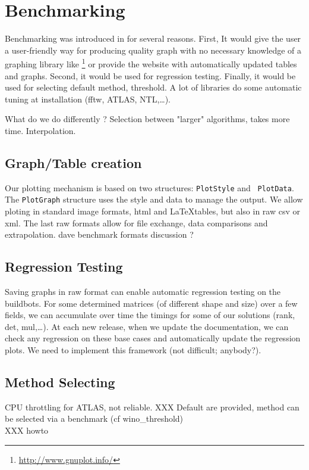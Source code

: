 \section{Benchmarking}\label{sec:bench}
%
Benchmarking was introduced in \linbox for several reasons. First, It would
give the user a user-friendly way for producing quality graph with no necessary
knowledge of a graphing library like \gnuplot%
%
%
\footnote{\url{http://www.gnuplot.info/}}
%
or provide the \linbox website with automatically updated tables and graphs.
Second, it would be used for regression testing.  Finally, it would be used for
selecting default method, threshold. A lot of libraries do some automatic tuning
at installation (fftw, ATLAS, NTL,\ldots).
%
\par
%
What do we do differently ? Selection between "larger" algorithms, takes more time.
Interpolation.
%
%
\subsection{Graph/Table creation}
%
Our plotting mechanism is based on two structures: {\tt PlotStyle} and {\tt
PlotData}. The  {\tt PlotGraph} structure uses the style and data to manage the
output.  We allow ploting in standard image formats, html and \LaTeX tables,
but also in raw csv or xml. The last raw formats allow for file exchange, data
comparisons and extrapolation.
\danger dave benchmark formats discussion ?
%
\par
%
% 
%
%
\subsection{Regression Testing}
%
Saving graphs in raw format can enable automatic regression testing on the
buildbots. For some determined matrices (of different shape and size) over a
few fields, we can accumulate over time the timings for some of our solutions
(rank, det, mul,\ldots). At each new release, when we update the documentation,
we can check any regression on these base cases and automatically update the
regression plots.
\danger We need to implement this framework (not difficult; anybody?).
%
\subsection{Method Selecting}
%
CPU throttling for ATLAS, \fflasffpack not reliable.
XXX Default are provided, method can be selected via a benchmark (cf wino\_threshold)\\
XXX howto
